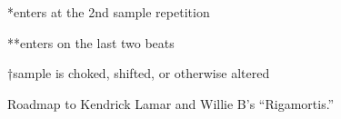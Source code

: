 \begin{table}[h!]
\hfill{*enters at the 2nd sample repetition}

\hfill{**enters on the last two beats}

\hfill{†sample is choked, shifted, or otherwise altered}
    \caption{Roadmap to Kendrick Lamar and Willie B's ``Rigamortis.''}
    \label{tab:2}
\end{table}


\newpage